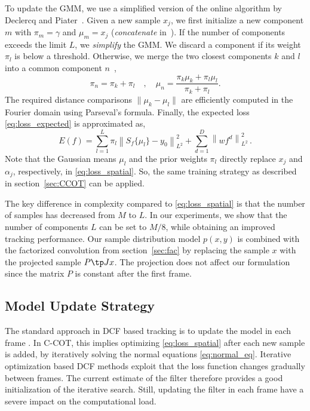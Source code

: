 \documentclass[10pt,twocolumn,letterpaper]{article}
\begin{document}
To update the GMM, we use a simplified version of the online algorithm by Declercq and Piater~\cite{Declercq2008}. Given a new sample $x_j$, we first initialize a new component $m$ with $\pi_m = \gamma$ and $\mu_m = x_j$ (\emph{concatenate} in~\cite{Declercq2008}). If the number of components exceeds the limit $L$, we \emph{simplify} the GMM.  We discard a component if its weight $\pi_l$ is below a threshold. Otherwise, we merge the two closest components $k$ and $l$ into a common component $n$~\cite{Declercq2008},
\begin{equation}
	\label{eq:gmm_merge}
	\pi_n = \pi_k + \pi_l \quad , \quad \mu_n = \frac{\pi_k \mu_k + \pi_l \mu_l}{\pi_k + \pi_l} .
\end{equation}
The required distance comparisons $\|\mu_k - \mu_l\|$ are efficiently computed in the Fourier domain using Parseval's formula. Finally, the expected loss \eqref{eq:loss_expected} is approximated as,
\begin{equation}
\label{eq:loss_gmm}
E(f) = \sum_{l=1}^{L} \pi_l \left\| S_f\{\mu_l\} - y_0 \right\|^2_{L^2} + \sum_{d=1}^{D} \left\| w f^d \right\|^2_{L^2} \,.
\end{equation}
Note that the Gaussian means $\mu_l$ and the prior weights $\pi_l$ directly replace $x_j$ and $\alpha_j$, respectively, in \eqref{eq:loss_spatial}. So, the same training strategy as described in section~\ref{sec:CCOT} can be applied.

The key difference in complexity compared to \eqref{eq:loss_spatial} is that the number of samples has decreased from $M$ to $L$. In our experiments, we show that the number of components $L$ can be set to $M / 8$, while obtaining an improved tracking performance. Our sample distribution model $p(x,y)$ is combined with the factorized convolution from section~\ref{sec:fac} by replacing the sample $x$  with the projected sample $P\tp J{x}$. The projection does not affect our formulation since the matrix $P$ is constant after the first frame.

\subsection{Model Update Strategy}
\label{sec:optimization}

The standard approach in DCF based tracking is to update the model in each frame \cite{MOSSE2010,DanelljanICCV2015,Henriques14}. In C-COT, this implies optimizing \eqref{eq:loss_spatial} after each new sample is added, by iteratively solving the normal equations \eqref{eq:normal_eq}. Iterative optimization based DCF methods exploit that the loss function changes gradually between frames. The current estimate of the filter therefore provides a good initialization of the iterative search. Still, updating the filter in each frame have a severe impact on the computational load.
\end{document}
